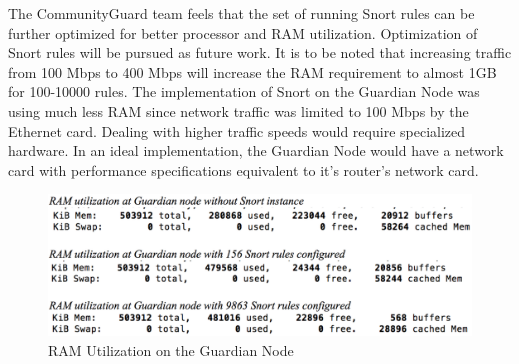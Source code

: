 The CommunityGuard team  feels that the set of running Snort rules can be further optimized for better processor and RAM utilization. Optimization of Snort rules will be pursued as future work. It is to be noted that increasing traffic from 100 Mbps to 400 Mbps will increase the RAM requirement to almost 1GB for 100-10000 rules. The implementation of Snort on the Guardian Node was using much less RAM since network traffic was limited to 100 Mbps by the Ethernet card. Dealing with higher traffic speeds would require specialized hardware. In an ideal implementation, the Guardian Node would have a network card with performance specifications equivalent to it's router's network card.

\begin{figure}
    \centering
    \includegraphics[width=0.85\columnwidth]{figs/SnortRam.png}
    \caption{RAM Utilization on the Guardian Node}
    \label{fig:ramutil}
\end{figure}

